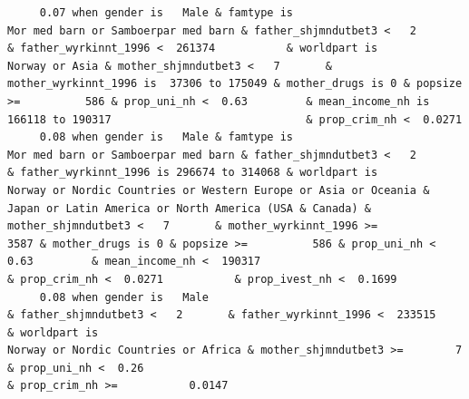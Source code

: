 \documentclass[
  letterpaper,
  DIV=11,
  numbers=noendperiod]{scrreprt}
\begin{document}
\begin{verbatim}
     0.07 when gender is   Male & famtype is                              Mor med barn or Samboerpar med barn & father_shjmndutbet3 <   2       & father_wyrkinnt_1996 <  261374           & worldpart is                                                                                                                      Norway or Asia & mother_shjmndutbet3 <   7       & mother_wyrkinnt_1996 is  37306 to 175049 & mother_drugs is 0 & popsize >=          586 & prop_uni_nh <  0.63         & mean_income_nh is 166118 to 190317                              & prop_crim_nh <  0.0271                                                                                                                                                                                                                                                                                      
     0.08 when gender is   Male & famtype is                              Mor med barn or Samboerpar med barn & father_shjmndutbet3 <   2       & father_wyrkinnt_1996 is 296674 to 314068 & worldpart is            Norway or Nordic Countries or Western Europe or Asia or Oceania & Japan or Latin America or North America (USA & Canada) & mother_shjmndutbet3 <   7       & mother_wyrkinnt_1996 >=             3587 & mother_drugs is 0 & popsize >=          586 & prop_uni_nh <  0.63         & mean_income_nh <  190317                                        & prop_crim_nh <  0.0271           & prop_ivest_nh <  0.1699                                                                                                                                                                                                                                                  
     0.08 when gender is   Male                                                                               & father_shjmndutbet3 <   2       & father_wyrkinnt_1996 <  233515           & worldpart is                                                                                                Norway or Nordic Countries or Africa & mother_shjmndutbet3 >=        7                                                                                          & prop_uni_nh <  0.26                                                                           & prop_crim_nh >=           0.0147                                                                                                                                                                                                                                                                            

\end{verbatim}
\end{document}
